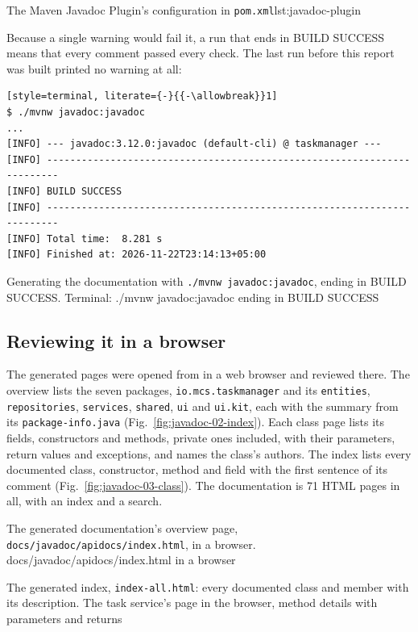   {The Maven Javadoc Plugin's configuration in \texttt{pom.xml}}{lst:javadoc-plugin}

Because a single warning would fail it, a run that ends in BUILD SUCCESS means that every comment passed every check.
The last run before this report was built printed no warning at all:
\begin{lstlisting}[style=terminal, literate={-}{{-\allowbreak}}1]
$ ./mvnw javadoc:javadoc
...
[INFO] --- javadoc:3.12.0:javadoc (default-cli) @ taskmanager ---
[INFO] ------------------------------------------------------------------------
[INFO] BUILD SUCCESS
[INFO] ------------------------------------------------------------------------
[INFO] Total time:  8.281 s
[INFO] Finished at: 2026-11-22T23:14:13+05:00
\end{lstlisting}

  {Generating the documentation with \texttt{./mvnw javadoc:javadoc}, ending in BUILD SUCCESS.}
  {Terminal: ./mvnw javadoc:javadoc ending in BUILD SUCCESS}

\subsection{Reviewing it in a browser}

The generated pages were opened from  in a web browser and reviewed there. The
overview lists the seven packages, \texttt{io.mcs.taskmanager} and its \texttt{entities}, \texttt{repositories},
\texttt{services}, \texttt{shared}, \texttt{ui} and \texttt{ui.kit}, each with the summary from its
\texttt{package-info.java} (Fig.~\ref{fig:javadoc-02-index}). Each class page lists its fields, constructors and
methods, private ones included, with their parameters, return values and exceptions, and names the class's authors.
The index lists every documented class, constructor, method and field with the first sentence of its comment
(Fig.~\ref{fig:javadoc-03-class}). The documentation is 71 HTML pages in all, with an index and a search.

  {The generated documentation's overview page, \texttt{docs/javadoc/apidocs/index.html}, in a browser.}
  {docs/javadoc/apidocs/index.html in a browser}

  {The generated index, \texttt{index-all.html}: every documented class and member with its description.}
  {The task service's page in the browser, method details with parameters and returns}
